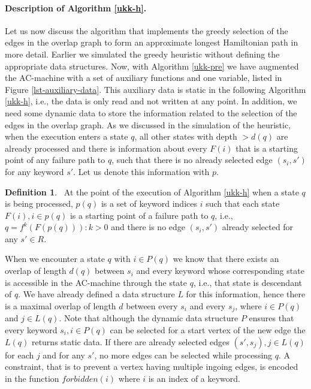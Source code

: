 \documentclass[english,twoside,censored,csm,algorithms-track-2020]{HYthesisML}
\theoremstyle{plain}
\theoremstyle{definition}
\newtheorem{definition}[theorem]{Definition}
\begin{document}
\paragraph{Description of Algorithm \ref{ukk-h}.}
Let us now discuss the algorithm that implements the greedy selection of the edges in the
overlap graph to form an approximate longest Hamiltonian path in more detail. Earlier we simulated
the greedy heuristic without defining the appropriate data structures. Now, with Algorithm
\ref{ukk-pre} we have augmented the AC-machine with a set of auxiliary functions and one variable,
listed in Figure \ref{lst-auxiliary-data}.
This auxiliary data is static in the following Algorithm \ref{ukk-h}, i.e., the data is only read
and not written at any point. In addition, we need some dynamic data to store the information
related to the selection of the edges in the overlap graph. As we discussed in the simulation
of the heuristic, when the execution enters a state $q$, all other states with depth $>d(q)$ are
already processed and there is information about every $F(i)$ that is a starting point of any failure
path to $q$,
such that there is no already selected edge $(s_i, s')$ for any keyword $s'$. Let us denote
this information with $p$.

\begin{definition}~\label{def-p}
  At the point of the execution of Algorithm \ref{ukk-h} when a state $q$ is being processed,
  $p(q)$ is a set of keyword indices $i$ such that each state $ F(i), i\in p(q)$ is
  a starting point of a failure path to $q$, i.e., $q = f^k(F(p(q))) : k>0$ and there is no
  edge $(s_i, s')$ already selected for any $s'\in R$.
\end{definition}

When we encounter a state $q$ with $i\in P(q)$ we know that there exists an overlap of length
$d(q)$ between $s_i$ and every keyword whose corresponding state is accessible in the AC-machine
through the state $q$, i.e., that state is descendant of $q$. We have already defined a data structure
$L$ for this information, hence there is a maximal overlap of length $d$ between every $s_i$
and every $s_j$, where $i\in P(q)$ and $j\in L(q)$.
Note that although the dynamic data structure $P$ ensures that every keyword $s_i, i\in P(q)$ can be selected
for a start vertex of the new edge the $L(q)$ returns static data. If there are already selected
edges $(s',s_j), j\in L(q)$ for each $j$ and for any $s'$, no more edges can be selected while processing $q$.
A constraint, that is to prevent a vertex having multiple ingoing edges, is encoded in the
function $forbidden(i)$ where $i$ is an index of a keyword.
\end{document}
